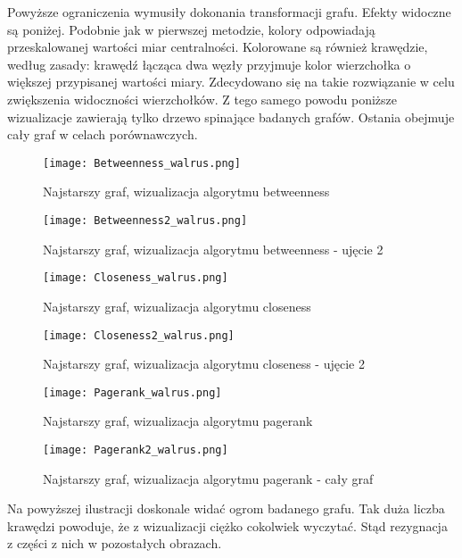 Powyższe ograniczenia wymusiły dokonania transformacji grafu. Efekty widoczne są poniżej. Podobnie jak w pierwszej metodzie, kolory odpowiadają przeskalowanej wartości miar centralności. Kolorowane są również krawędzie, według zasady: krawędź łącząca dwa węzły przyjmuje kolor wierzchołka o większej przypisanej wartości miary. Zdecydowano się na takie rozwiązanie w celu zwiększenia widoczności wierzchołków. Z tego samego powodu poniższe wizualizacje zawierają tylko drzewo spinające badanych grafów. Ostania obejmuje cały graf w celach porównawczych. 

\FloatBarrier\FloatBarrier
\begin{figure}[h]
	\centering
	\texttt{[image: Betweenness\_walrus.png]}
	\caption{Najstarszy graf, wizualizacja algorytmu betweenness}
\end{figure}
\FloatBarrier\FloatBarrier
\FloatBarrier\FloatBarrier
\begin{figure}[h]
	\centering
	\texttt{[image: Betweenness2\_walrus.png]}
	\caption{Najstarszy graf, wizualizacja algorytmu betweenness - ujęcie 2}
\end{figure}
\FloatBarrier\FloatBarrier

\FloatBarrier\FloatBarrier
\begin{figure}[h]
	\centering
	\texttt{[image: Closeness\_walrus.png]}
	\caption{Najstarszy graf, wizualizacja algorytmu closeness}
\end{figure}
\FloatBarrier\FloatBarrier
\FloatBarrier\FloatBarrier
\begin{figure}[h]
	\centering
	\texttt{[image: Closeness2\_walrus.png]}
	\caption{Najstarszy graf, wizualizacja algorytmu closeness - ujęcie 2}
\end{figure}
\FloatBarrier\FloatBarrier        
\FloatBarrier\FloatBarrier
\begin{figure}[h]
	\centering
	\texttt{[image: Pagerank\_walrus.png]}
	\caption{Najstarszy graf, wizualizacja algorytmu pagerank}
\end{figure}
\FloatBarrier\FloatBarrier
\FloatBarrier\FloatBarrier
\begin{figure}[h]
	\centering
	\texttt{[image: Pagerank2\_walrus.png]}
	\caption{Najstarszy graf, wizualizacja algorytmu pagerank - cały graf}
\end{figure}
\FloatBarrier\FloatBarrier    

Na powyższej ilustracji doskonale widać ogrom badanego grafu. Tak duża liczba krawędzi powoduje, że z wizualizacji ciężko cokolwiek wyczytać. Stąd rezygnacja z części z nich w pozostałych obrazach.